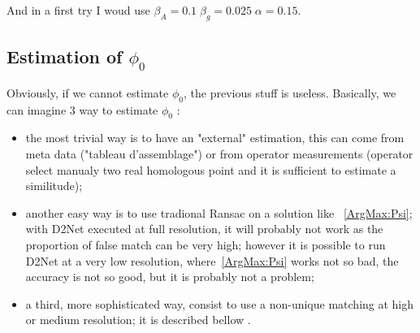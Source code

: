 And in a first try I woud use $\beta_A=0.1 \;  \beta_g=0.025 \; \alpha=0.15$.


\subsection{Estimation of $\phi_0$}

Obviously, if we cannot estimate $\phi_0$, the previous stuff is useless.
Basically, we can imagine $3$ way to estimate $\phi_0$ :

\begin{itemize}
   \item  the most trivial way is to have an "external" estimation, this can come from
          meta data ("tableau d'assemblage") or from operator measurements (operator select
          manualy two real homologous point and it is sufficient to estimate a similitude);

   \item  another easy way is to use tradional Ransac on a solution like ~\ref{ArgMax:Psi}; 
          with D2Net executed at full resolution, it will probably not work as the proportion
          of false match can be very high; however it is possible to run D2Net at a very low
          resolution, where~\ref{ArgMax:Psi} works not so bad, the accuracy is not so good, but
          it is probably not a problem;

   \item  a third, more sophisticated way, consist to use a non-unique matching at high
          or medium resolution; it is described bellow .
\end{itemize}

